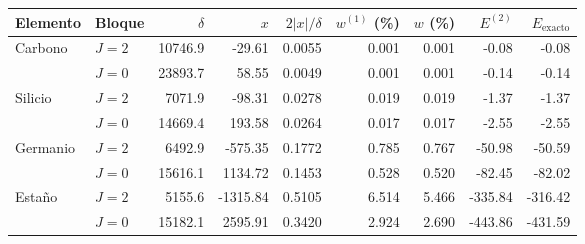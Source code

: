 \begin{tabular}{llrrrrrrr}
    \toprule
    Elemento & Bloque & $\delta$ & $x$ & $2|x|/\delta$ & $w^{(1)}$ (\%) & $w$ (\%) & $E^{(2)}$ & $E_{\text{exacto}}$ \\
    \midrule
    Carbono & $J = 2$ & 10746.9 & -29.61 & 0.0055 & 0.001 & 0.001 & -0.08 & -0.08 \\
     & $J = 0$ & 23893.7 & 58.55 & 0.0049 & 0.001 & 0.001 & -0.14 & -0.14 \\
    \midrule
    Silicio & $J = 2$ & 7071.9 & -98.31 & 0.0278 & 0.019 & 0.019 & -1.37 & -1.37 \\
     & $J = 0$ & 14669.4 & 193.58 & 0.0264 & 0.017 & 0.017 & -2.55 & -2.55 \\
    \midrule
    Germanio & $J = 2$ & 6492.9 & -575.35 & 0.1772 & 0.785 & 0.767 & -50.98 & -50.59 \\
     & $J = 0$ & 15616.1 & 1134.72 & 0.1453 & 0.528 & 0.520 & -82.45 & -82.02 \\
    \midrule
    Estaño & $J = 2$ & 5155.6 & -1315.84 & 0.5105 & 6.514 & 5.466 & -335.84 & -316.42 \\
     & $J = 0$ & 15182.1 & 2595.91 & 0.3420 & 2.924 & 2.690 & -443.86 & -431.59 \\
    \bottomrule
\end{tabular}
